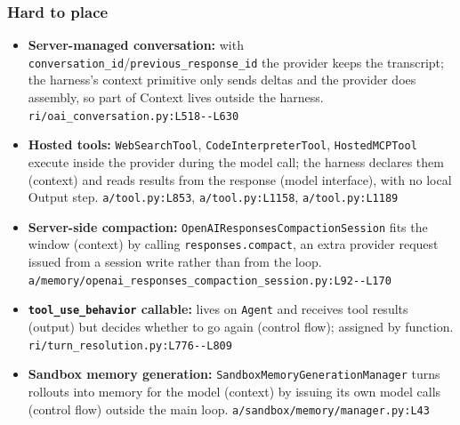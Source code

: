 \subsubsection*{Hard to place}
\begin{itemize}
\item \textbf{Server-managed conversation:} with \texttt{conversation\_\allowbreak{}id}/\texttt{previous\_\allowbreak{}response\_\allowbreak{}id} the provider keeps the transcript; the harness's context primitive only sends deltas and the provider does assembly, so part of Context lives outside the harness. \texttt{ri/\allowbreak{}oai\_\allowbreak{}conversation.\allowbreak{}py:\allowbreak{}L518-\allowbreak{}-\allowbreak{}L630}
\item \textbf{Hosted tools:} \texttt{WebSearchTool}, \texttt{CodeInterpreterTool}, \texttt{HostedMCPTool} execute inside the provider during the model call; the harness declares them (context) and reads results from the response (model interface), with no local Output step. \texttt{a/\allowbreak{}tool.\allowbreak{}py:\allowbreak{}L853}, \texttt{a/\allowbreak{}tool.\allowbreak{}py:\allowbreak{}L1158}, \texttt{a/\allowbreak{}tool.\allowbreak{}py:\allowbreak{}L1189}
\item \textbf{Server-side compaction:} \texttt{OpenAIResponsesCompactionSession} fits the window (context) by calling \texttt{responses.\allowbreak{}compact}, an extra provider request issued from a session write rather than from the loop. \texttt{a/\allowbreak{}memory/\allowbreak{}openai\_\allowbreak{}responses\_\allowbreak{}compaction\_\allowbreak{}session.\allowbreak{}py:\allowbreak{}L92-\allowbreak{}-\allowbreak{}L170}
\item \textbf{\texttt{tool\_\allowbreak{}use\_\allowbreak{}behavior} callable:} lives on \texttt{Agent} and receives tool results (output) but decides whether to go again (control flow); assigned by function. \texttt{ri/\allowbreak{}turn\_\allowbreak{}resolution.\allowbreak{}py:\allowbreak{}L776-\allowbreak{}-\allowbreak{}L809}
\item \textbf{Sandbox memory generation:} \texttt{SandboxMemoryGenerationManager} turns rollouts into memory for the model (context) by issuing its own model calls (control flow) outside the main loop. \texttt{a/\allowbreak{}sandbox/\allowbreak{}memory/\allowbreak{}manager.\allowbreak{}py:\allowbreak{}L43}
\end{itemize}

